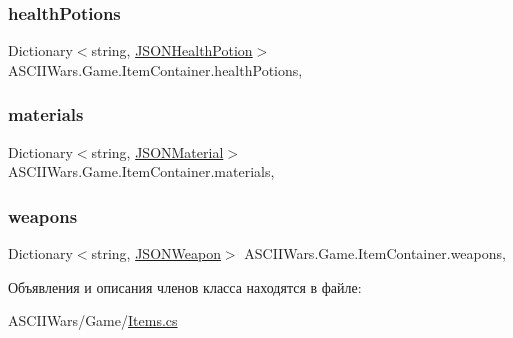 \subsubsection{\texorpdfstring{health\+Potions}{healthPotions}}
{\footnotesize\ttfamily Dictionary$<$string, \hyperlink{class_a_s_c_i_i_wars_1_1_game_1_1_j_s_o_n_health_potion}{J\+S\+O\+N\+Health\+Potion}$>$ A\+S\+C\+I\+I\+Wars.\+Game.\+Item\+Container.\+health\+Potions\hspace{0.3cm}{\ttfamily [get]}, {\ttfamily [set]}}

\hypertarget{class_a_s_c_i_i_wars_1_1_game_1_1_item_container_a503bd6d21fce823b843969ccf07871bd}{}\label{class_a_s_c_i_i_wars_1_1_game_1_1_item_container_a503bd6d21fce823b843969ccf07871bd} 
\subsubsection{\texorpdfstring{materials}{materials}}
{\footnotesize\ttfamily Dictionary$<$string, \hyperlink{class_a_s_c_i_i_wars_1_1_game_1_1_j_s_o_n_material}{J\+S\+O\+N\+Material}$>$ A\+S\+C\+I\+I\+Wars.\+Game.\+Item\+Container.\+materials\hspace{0.3cm}{\ttfamily [get]}, {\ttfamily [set]}}

\hypertarget{class_a_s_c_i_i_wars_1_1_game_1_1_item_container_aaa8cd3f87c9f17712bca4ea090166ce7}{}\label{class_a_s_c_i_i_wars_1_1_game_1_1_item_container_aaa8cd3f87c9f17712bca4ea090166ce7} 
\subsubsection{\texorpdfstring{weapons}{weapons}}
{\footnotesize\ttfamily Dictionary$<$string, \hyperlink{class_a_s_c_i_i_wars_1_1_game_1_1_j_s_o_n_weapon}{J\+S\+O\+N\+Weapon}$>$ A\+S\+C\+I\+I\+Wars.\+Game.\+Item\+Container.\+weapons\hspace{0.3cm}{\ttfamily [get]}, {\ttfamily [set]}}



Объявления и описания членов класса находятся в файле\+:\begin{DoxyCompactItemize}
\item 
A\+S\+C\+I\+I\+Wars/\+Game/\hyperlink{_items_8cs}{Items.\+cs}\end{DoxyCompactItemize}
